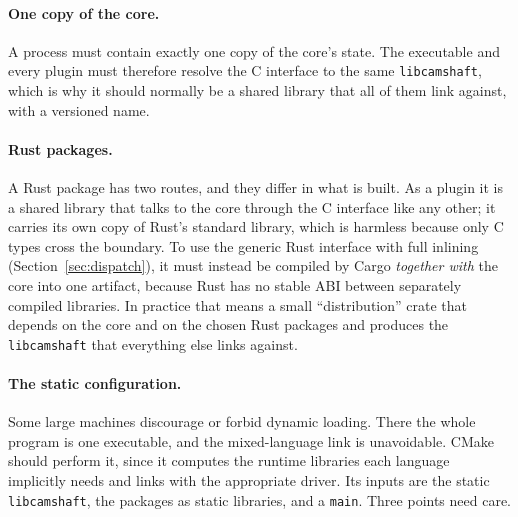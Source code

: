 \documentclass[11pt,a4paper]{article}
\newcommand{\code}[1]{\texttt{#1}}
\begin{document}
\paragraph{One copy of the core.}  A process must contain exactly one copy
of the core's state.  The executable and every plugin must therefore resolve
the C interface to the same \code{libcamshaft}, which is why it should normally
be a shared library that all of them link against, with a versioned name.

\paragraph{Rust packages.}  A Rust package has two routes, and they differ
in what is built.  As a plugin it is a shared library that talks to the core
through the C interface like any other; it carries its own copy of Rust's
standard library, which is harmless because only C types cross the boundary.
To use the generic Rust interface with full inlining
(Section~\ref{sec:dispatch}), it must instead be compiled by Cargo
\emph{together with} the core into one artifact, because Rust has no stable
ABI between separately compiled libraries.  In practice that means a small
\enquote{distribution} crate that depends on the core and on the chosen Rust
packages and produces the \code{libcamshaft} that everything else links against.

\paragraph{The static configuration.}  Some large machines discourage or
forbid dynamic loading.  There the whole program is one executable, and the
mixed-language link is unavoidable.  CMake should perform it, since it
computes the runtime libraries each language implicitly needs and links with
the appropriate driver.  Its inputs are the static \code{libcamshaft}, the
packages as static libraries, and a \code{main}.  Three points need care.
\end{document}
